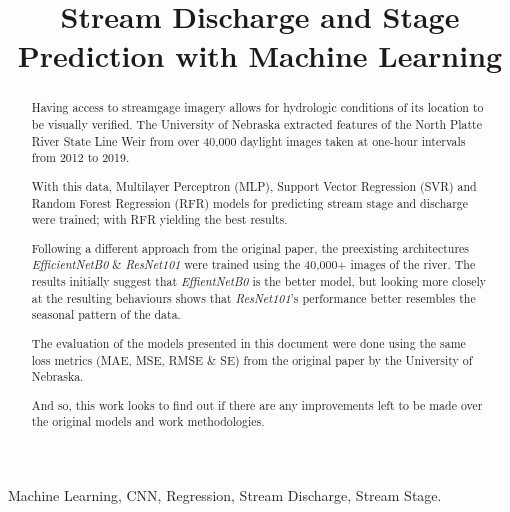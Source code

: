 \documentclass[conference]{IEEEtran}
\begin{document}
\title{Stream Discharge and Stage Prediction with Machine Learning}

\author{
}

\maketitle
\begin{abstract}
Having access to streamgage imagery allows for hydrologic conditions of its location to be visually verified. The University of Nebraska extracted features of the North Platte River State Line Weir from over 40,000 daylight images taken at one-hour intervals from 2012 to 2019.

With this data, Multilayer Perceptron (MLP), Support Vector Regression (SVR) and Random Forest Regression (RFR) models for predicting stream stage and discharge were trained; with RFR yielding the best results.

Following a different approach from the original paper, the preexisting architectures \textit{EfficientNetB0} \& \textit{ResNet101} were trained using the 40,000+ images of the river. The results initially suggest that \textit{EffientNetB0} is the better model, but looking more closely at the resulting behaviours shows that \textit{ResNet101}'s performance better resembles the seasonal pattern of the data.

The evaluation of the models presented in this document were done using the same loss metrics (MAE, MSE, RMSE \& SE) from the original paper by the University of Nebraska.

And so, this work looks to find out if there are any improvements left to be made over the original models and work methodologies.
\end{abstract}

\begin{IEEEkeywords}
Machine Learning, CNN, Regression, Stream Discharge, Stream Stage.
\end{IEEEkeywords}
\end{document}

